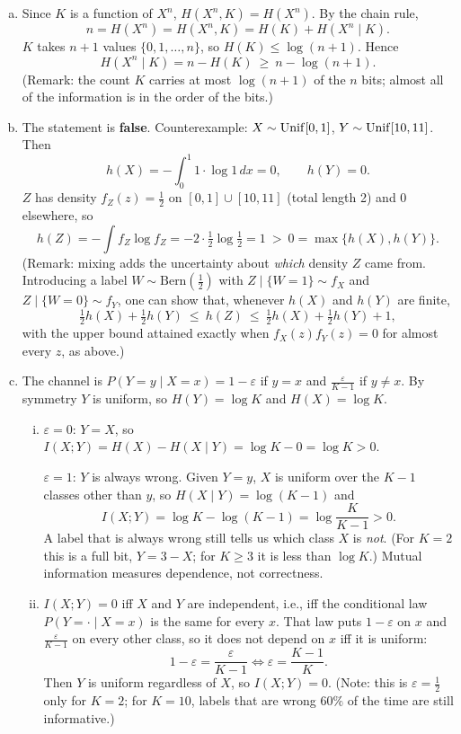 \documentclass[12pt]{article}
\newcommand{\Bern}{{\mbox{Bern}}}
\begin{document}
\begin{enumerate}
\begin{solution}
\begin{enumerate}[a)]

\item Since $K$ is a function of $X^n$, $H(X^n,K)=H(X^n)$. By the chain rule,
\[
n=H(X^n)=H(X^n,K)=H(K)+H(X^n\mid K).
\]
$K$ takes $n+1$ values $\{0,1,\dots,n\}$, so $H(K)\le\log(n+1)$. Hence
\[
H(X^n\mid K)=n-H(K)\ \ge\ n-\log(n+1).
\]
(Remark: the count $K$ carries at most $\log(n+1)$ of the $n$ bits; almost all of the information is in the order of the bits.)

\item The statement is {\bf false}. Counterexample: $X\sim{\rm Unif}[0,1]$, $Y\sim{\rm Unif}[10,11]$. Then
\[
h(X)=-\int_0^1 1\cdot\log 1\,dx=0,\qquad h(Y)=0.
\]
$Z$ has density $f_Z(z)=\frac12$ on $[0,1]\cup[10,11]$ (total length 2) and $0$ elsewhere, so
\[
h(Z)=-\int f_Z\log f_Z=-2\cdot\tfrac12\log\tfrac12=1\ >\ 0=\max\{h(X),h(Y)\}.
\]
(Remark: mixing adds the uncertainty about \emph{which} density $Z$ came from. Introducing a label $W\sim\Bern(\frac12)$ with $Z\mid\{W=1\}\sim f_X$ and $Z\mid\{W=0\}\sim f_Y$, one can show that, whenever $h(X)$ and $h(Y)$ are finite,
\[
\tfrac12h(X)+\tfrac12h(Y)\ \le\ h(Z)\ \le\ \tfrac12h(X)+\tfrac12h(Y)+1,
\]
with the upper bound attained exactly when $f_X(z)f_Y(z)=0$ for almost every $z$, as above.)

\item The channel is $P(Y=y\mid X=x)=1-\varepsilon$ if $y=x$ and $\frac{\varepsilon}{K-1}$ if $y\ne x$. By symmetry $Y$ is uniform, so $H(Y)=\log K$ and $H(X)=\log K$.
\begin{enumerate}[i)]
\item $\varepsilon=0$: $Y=X$, so $I(X;Y)=H(X)-H(X\mid Y)=\log K-0=\log K>0$.

$\varepsilon=1$: $Y$ is always wrong. Given $Y=y$, $X$ is uniform over the $K-1$ classes other than $y$, so $H(X\mid Y)=\log(K-1)$ and
\[
I(X;Y)=\log K-\log(K-1)=\log\frac{K}{K-1}>0.
\]
A label that is always wrong still tells us which class $X$ is \emph{not}. (For $K=2$ this is a full bit, $Y=3-X$; for $K\ge 3$ it is less than $\log K$.) Mutual information measures dependence, not correctness.

\item $I(X;Y)=0$ iff $X$ and $Y$ are independent, i.e., iff the conditional law $P(Y=\cdot\mid X=x)$ is the same for every $x$. That law puts $1-\varepsilon$ on $x$ and $\frac{\varepsilon}{K-1}$ on every other class, so it does not depend on $x$ iff it is uniform:
\[
1-\varepsilon=\frac{\varepsilon}{K-1}\iff\varepsilon=\frac{K-1}{K}.
\]
Then $Y$ is uniform regardless of $X$, so $I(X;Y)=0$. (Note: this is $\varepsilon=\frac12$ only for $K=2$; for $K=10$, labels that are wrong $60\%$ of the time are still informative.)
\end{enumerate}


\end{enumerate}
\end{solution}
\end{enumerate}
\end{document}
